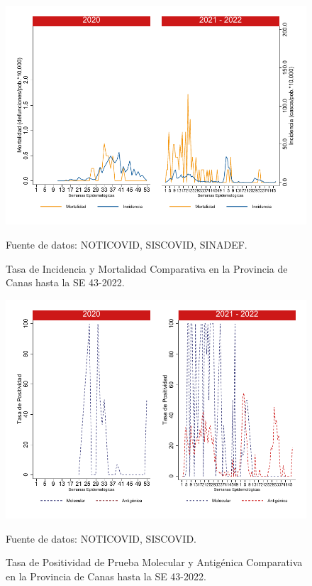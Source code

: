 \documentclass[12pt,a4paper,openany]{book}
\begin{document}
	
	\begin{figure}[h]
		\caption{Tasa de Incidencia y Mortalidad Comparativa en la Provincia de Canas hasta la SE 43-2022.}\label{fig:inc_mort_canas}
		\begin{center}
			\includegraphics[width=0.85\linewidth]{../figuras/incidencia_mortalidad_20_21_4.pdf}
		\end{center}
		{\footnotesize {Fuente de datos: NOTICOVID, SISCOVID, SINADEF.}}
	\end{figure}
	
	\begin{figure}[h]
		\caption{Tasa de Positividad de Prueba Molecular y Antigénica Comparativa en la Provincia de Canas hasta la SE 43-2022.}\label{fig:positividad_canas}
		\begin{center}
			\includegraphics[width=0.7\linewidth]{../figuras/positividad_20_21_4.pdf}
		\end{center}
		{\footnotesize {Fuente de datos: NOTICOVID, SISCOVID.}}
	\end{figure}
	
\end{document}
